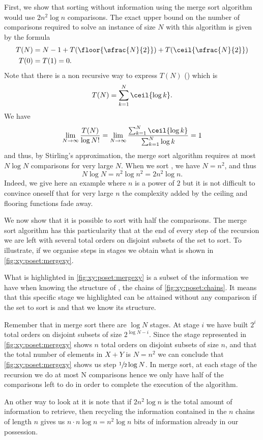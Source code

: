 First, we show that sorting \XY without information using the merge sort algorithm would use $2
n^2 \log n$ comparisons. The exact upper bound on the number
of comparisons required to solve an instance of size \(N\) with this algorithm
is given by the formula
\begin{align*}
T(N) &= N - 1 + T(\floor{\sfrac{N}{2}}) + T(\ceil{\sfrac{N}{2}})\\
T(0) &= T(1) = 0.
\end{align*}
Note that there is a non recursive way to express \(T(N)\) (\citet*{OEIS:A001855}) which is
\begin{displaymath}
T(N) = \sum_{k=1}^{N} \ceil{\log k}.
\end{displaymath}
We have
\begin{displaymath}
\lim_{N\to\infty}\frac{T(N)}{\log N!} =
\lim_{N\to\infty}\frac{\sum_{k=1}^{N}\ceil{\log k}}{ \sum_{k=1}^{N} \log k} = 1
\end{displaymath}
and thus, by Stirling's approximation, the merge sort algorithm requires at
most \(N \log N\) comparisons for very large \(N\). When we sort \XY, we have \(N =
n^2\), and thus
\[N \log N = n^2 \log n^2 = 2 n^2 \log n.\]
Indeed, we give here an example where \(n\) is a power of \(2\) but it is not
difficult to convince oneself that for very large \(n\) the complexity added
by the ceiling and flooring functions fade away.

We now show that it is possible to sort \XY with half the comparisons. The
merge sort algorithm has this particularity that at the end of every step of
the recursion we are left with several total orders on disjoint subsets of the
set to sort. To illustrate, if we organise steps in stages we obtain what is
shown in \ref{fig:xy:poset:mergexy}.

What is highlighted in \ref{fig:xy:poset:mergexy} is a subset of the
information we have when knowing the structure of \XY, \ie the chains of
\ref{fig:xy:poset:chains}. It means that this specific stage we
highlighted can be attained without any comparison if the set to sort is \XY
and that we know its structure.

Remember that in merge sort there are $\log N$ stages. At stage $i$ we have
built $2^{i}$ total orders on disjoint subsets of size $2^{\log N - i}$. Since
the stage represented in \ref{fig:xy:poset:mergexy} shows $n$ total orders on
disjoint subsets of size $n$, and that the total number of elements in $X+Y$ is
$N = n^2$ we can conclude that \ref{fig:xy:poset:mergexy} shows us step
$\sfrac{1}{2} \log N$. In merge sort, at each stage of the recursion we do at
most N comparisons hence we only have half of the comparisons left to do in
order to complete the execution of the algorithm.

An other way to look at it is note that if \(2n^2 \log n\) is the total amount
of information to retrieve, then recycling the information contained in the
\(n\) chains of length \(n\) gives us \(n \cdot n \log n = n^2 \log n\) bits of
information already in our possession.

